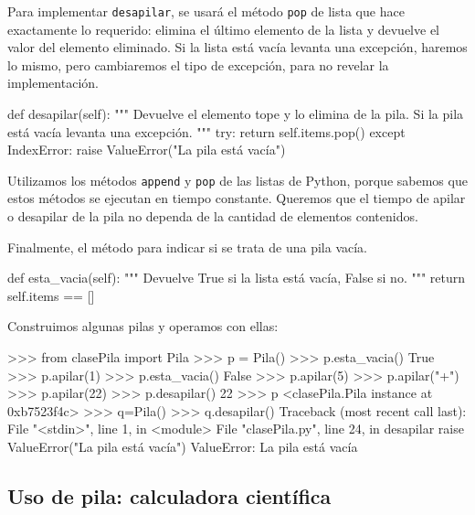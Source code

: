 Para implementar \lstinline!desapilar!, se usará el método \lstinline!pop!
de lista que hace exactamente lo requerido: elimina el último elemento de
la lista y devuelve el valor del elemento eliminado. Si la lista está vacía
levanta una excepción, haremos lo mismo, pero cambiaremos el tipo de
excepción, para no revelar la implementación.

\begin{codigo-python-sn}
    def desapilar(self):
        """ Devuelve el elemento tope y lo elimina de la pila.
            Si la pila está vacía levanta una excepción. """
        try:
            return self.items.pop()
        except IndexError:
            raise ValueError("La pila está vacía")
\end{codigo-python-sn}

\begin{observacion}
Utilizamos los métodos \lstinline!append! y \lstinline!pop! de las listas de
Python, porque sabemos que estos métodos se ejecutan en tiempo constante.
Queremos que el tiempo de apilar o desapilar de la pila no dependa de la
cantidad de elementos contenidos.
\end{observacion}

Finalmente, el método para indicar si se trata de una pila vacía.

\begin{codigo-python-sn}
    def esta_vacia(self):
        """ Devuelve True si la lista está vacía, False si no. """
        return self.items == []
\end{codigo-python-sn}

Construimos algunas pilas y operamos con ellas:

\begin{codigo-python-sn}
>>> from clasePila import Pila
>>> p = Pila()
>>> p.esta_vacia()
True
>>> p.apilar(1)
>>> p.esta_vacia()
False
>>> p.apilar(5)
>>> p.apilar("+")
>>> p.apilar(22)
>>> p.desapilar()
22
>>> p
<clasePila.Pila instance at 0xb7523f4c>
>>> q=Pila()
>>> q.desapilar()
Traceback (most recent call last):
  File "<stdin>", line 1, in <module>
  File "clasePila.py", line 24, in desapilar
    raise ValueError("La pila está vacía")
ValueError: La pila está vacía
\end{codigo-python-sn}

\subsection{Uso de pila: calculadora científica}

